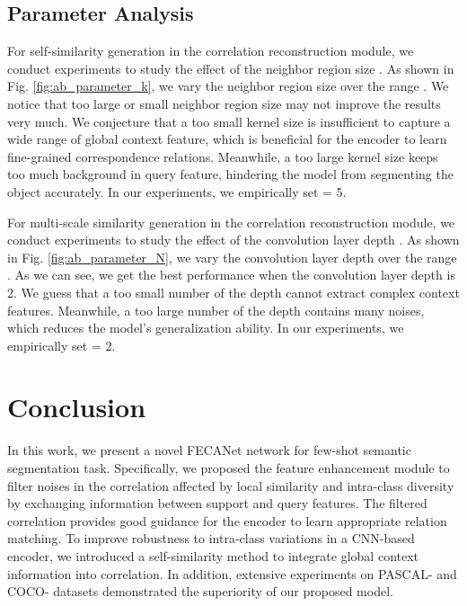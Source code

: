\documentclass[journal]{IEEEtran}
\begin{document}
\subsection{Parameter Analysis} 
\label{subsec_pa}
For self-similarity generation in the correlation reconstruction module, we conduct experiments to study the effect of the neighbor region size . As shown in Fig. \ref{fig:ab_parameter_k}, we vary the neighbor region size  over the range . We notice that too large or small neighbor region size may not improve the results very much. We conjecture that a too small kernel size is insufficient to capture a wide range of global context feature, which is beneficial for the encoder to learn fine-grained correspondence relations. Meanwhile, a too large kernel size keeps too much background in query feature, hindering the model from segmenting the object accurately. In our experiments, we empirically set  = 5. \par











For multi-scale similarity generation in the correlation reconstruction module, we conduct experiments to study the effect of the convolution layer depth . As shown in Fig. \ref{fig:ab_parameter_N}, we vary the convolution layer depth  over the range . As we can see, we get the best performance when the convolution layer depth is 2. We guess that a too small number of the depth  cannot extract complex context features. Meanwhile, a too large number of the depth  contains many noises, which reduces the model's generalization ability. In our experiments, we empirically set  = 2.

\section{Conclusion}
\label{conclusion}

In this work, we present a novel FECANet network for few-shot semantic segmentation task. Specifically, we proposed the feature enhancement module to filter noises in the correlation affected by local similarity and intra-class diversity by exchanging information between support and query features. The filtered correlation provides good guidance for the encoder to learn appropriate relation matching. To improve robustness to intra-class variations in a CNN-based encoder, we introduced a self-similarity method to integrate global context information into correlation. In addition, extensive experiments on PASCAL- and COCO- datasets demonstrated the superiority of our proposed model.
\end{document}
